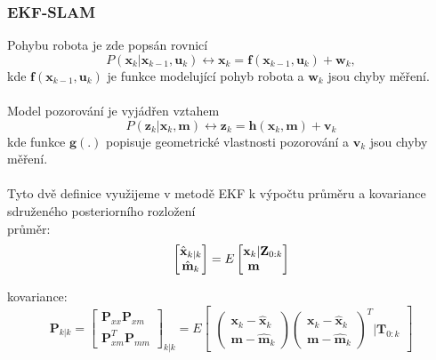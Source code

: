 \documentclass[11pt]{article}
\begin{document}
\subsubsection{EKF-SLAM}
Pohybu robota je zde popsán rovnicí
\begin{equation}
	P(\textbf{x}_k|\textbf{x}_{k-1},\textbf{u}_k)\leftrightarrow \textbf{x}_k=\textbf{f}(\textbf{x}_{k-1},\textbf{u}_k)+\textbf{w}_k,
\end{equation} 
kde $\textbf{f}(\textbf{x}_{k-1},\textbf{u}_k)$ je funkce modelující pohyb robota a $\textbf{w}_k$ jsou chyby měření.\\
\\
Model pozorování je vyjádřen vztahem
\begin{equation}
	P(\textbf{z}_k|\textbf{x}_k,\textbf{m})\leftrightarrow \textbf{z}_k=\textbf{h}(\textbf{x}_k,\textbf{m})+\textbf{v}_k
\end{equation}
kde funkce $\textbf{g}(.)$ popisuje geometrické vlastnosti pozorování a $\textbf{v}_k$ jsou chyby měření.\\
\\
Tyto dvě definice využijeme v metodě EKF k výpočtu průměru a kovariance sdruženého posteriorního rozložení\\
\indent průměr:
\begin{equation}
	\begin{bmatrix}
	\hat{\textbf{x}}_{k|k}\\\hat{\textbf{m}}_k
	\end{bmatrix}=E
	\begin{bmatrix}
	\textbf{x}_k |\textbf{Z}_{0:k}\\\textbf{m}\indent
	\end{bmatrix}
\end{equation}

\indent kovariance:
\begin{equation}
	\textbf{P}_{k|k}=\begin{bmatrix}
	\textbf{P}_{xx} \textbf{P}_{xm}\\\textbf{P}^T_{xm} \textbf{P}_{mm}
	\end{bmatrix}_{k|k}=E\begin{bmatrix}
	\begin{pmatrix}
	\textbf{x}_k-\hat{\textbf{x}}_k\\\textbf{m}-\hat{\textbf{m}}_k
	\end{pmatrix} \begin{pmatrix}
	\textbf{x}_k-\hat{\textbf{x}}_k\\\textbf{m}-\hat{\textbf{m}}_k
	\end{pmatrix}^T |\textbf{T}_{0:k}
	\end{bmatrix}
\end{equation}
\end{document}
